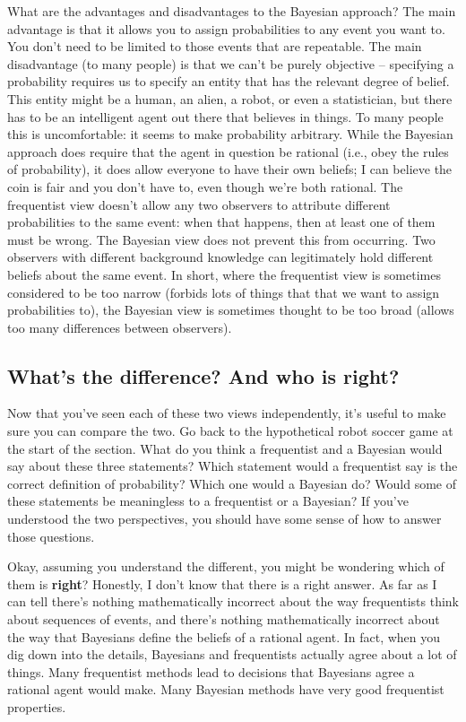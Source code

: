 \documentclass[
  letterpaper,
  DIV=11,
  numbers=noendperiod]{scrreprt}
\begin{document}
What are the advantages and disadvantages to the Bayesian approach? The
main advantage is that it allows you to assign probabilities to any
event you want to. You don't need to be limited to those events that are
repeatable. The main disadvantage (to many people) is that we can't be
purely objective -- specifying a probability requires us to specify an
entity that has the relevant degree of belief. This entity might be a
human, an alien, a robot, or even a statistician, but there has to be an
intelligent agent out there that believes in things. To many people this
is uncomfortable: it seems to make probability arbitrary. While the
Bayesian approach does require that the agent in question be rational
(i.e., obey the rules of probability), it does allow everyone to have
their own beliefs; I can believe the coin is fair and you don't have to,
even though we're both rational. The frequentist view doesn't allow any
two observers to attribute different probabilities to the same event:
when that happens, then at least one of them must be wrong. The Bayesian
view does not prevent this from occurring. Two observers with different
background knowledge can legitimately hold different beliefs about the
same event. In short, where the frequentist view is sometimes considered
to be too narrow (forbids lots of things that that we want to assign
probabilities to), the Bayesian view is sometimes thought to be too
broad (allows too many differences between observers).

\subsection{What's the difference? And who is
right?}\label{whats-the-difference-and-who-is-right}

Now that you've seen each of these two views independently, it's useful
to make sure you can compare the two. Go back to the hypothetical robot
soccer game at the start of the section. What do you think a frequentist
and a Bayesian would say about these three statements? Which statement
would a frequentist say is the correct definition of probability? Which
one would a Bayesian do? Would some of these statements be meaningless
to a frequentist or a Bayesian? If you've understood the two
perspectives, you should have some sense of how to answer those
questions.

Okay, assuming you understand the different, you might be wondering
which of them is \textbf{right}? Honestly, I don't know that there is a
right answer. As far as I can tell there's nothing mathematically
incorrect about the way frequentists think about sequences of events,
and there's nothing mathematically incorrect about the way that
Bayesians define the beliefs of a rational agent. In fact, when you dig
down into the details, Bayesians and frequentists actually agree about a
lot of things. Many frequentist methods lead to decisions that Bayesians
agree a rational agent would make. Many Bayesian methods have very good
frequentist properties.
\end{document}
